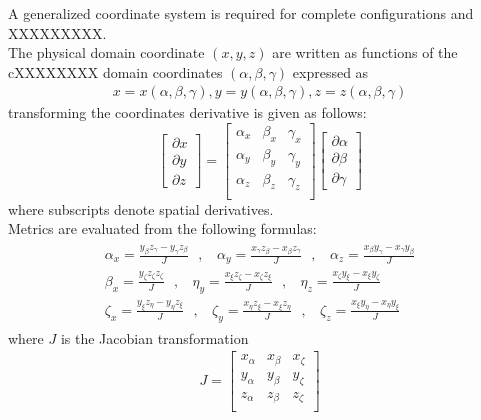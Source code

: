 \documentclass[11pt]{report}
\newcommand{\sps}{\\[0.2cm]}
\newcommand{\NI}{\noindent}
\begin{document}
	\NI A generalized coordinate system is required for complete configurations and XXXXXXXXX.\\
	The physical domain coordinate $(x,y,z)$ are written as functions of the cXXXXXXXX domain coordinates $(\alpha,\beta,\gamma)$ expressed as
	\begin{eqnarray}
		x=x(\alpha,\beta,\gamma), y = y(\alpha,\beta,\gamma), z=z(\alpha,\beta,\gamma)\label{eq:4_7}
	\end{eqnarray} 
	transforming the coordinates derivative is given as follows:
	\begin{equation}
		\begin{bmatrix}
			\partial x\\
			\partial y \\
			\partial z
		\end{bmatrix} = 
		\begin{bmatrix}
			\alpha_x & \beta_x & \gamma_x\\
			\alpha_y & \beta_y & \gamma_y\\
			\alpha_z & \beta_z & \gamma_z\\
		\end{bmatrix}
		\begin{bmatrix}
			\partial \alpha\\
			\partial\beta\\
			\partial\gamma
		\end{bmatrix}\label{eq:4_8}
	\end{equation}
	where subscripts denote spatial derivatives.\\
	Metrics are evaluated from the following formulas:
	\begin{gather}
		\begin{gathered}
			\alpha_x = \frac{y_\beta z_\gamma - y_\gamma z_\beta}{J}~~~,~~~~ \alpha_y = \frac{x_\gamma z_\beta - x_\beta z_\gamma}{J}~~~,~~~~\alpha_z = \frac{x_\beta y_\gamma - x_\gamma y_\beta}{J}\sps
			\beta_x = \frac{y_\zeta z_\zeta z_\zeta}{J}~~~,~~~~ \eta_y = \frac{x_\xi z_\zeta - x_\zeta z_\xi}{J}~~~,~~~~ \eta_z = \frac{x_\zeta y_\xi - x_\xi y_\zeta}{J}\sps
			\zeta_x = \frac{y_\xi z_\eta - y_\eta z_\xi}{J}~~~,~~~~ \zeta_y = \frac{x_\eta z_\xi - x_\xi z_\eta}{J}~~~,~~~~ \zeta_z = \frac{x_\xi y_\eta - x_\eta y_\xi}{J}
		\end{gathered}
	\end{gather}
	where $J$ is the Jacobian transformation
	\begin{eqnarray}
		J = \begin{bmatrix}
			x_\alpha & x_\beta & x_\zeta\sps
			y_\alpha & y_\beta & y_\zeta\sps
			z_\alpha & z_\beta & z_\zeta\sps
		\end{bmatrix}
	\end{eqnarray}
\end{document}
